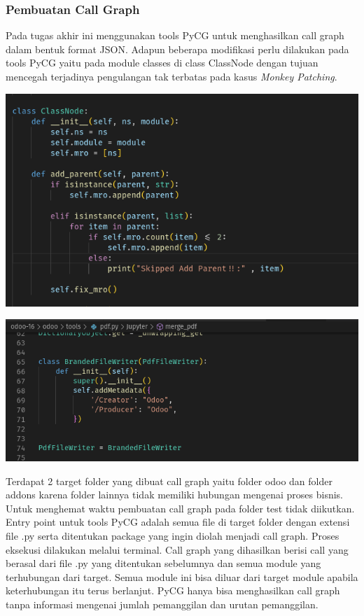 \subsubsection{Pembuatan Call Graph}
Pada tugas akhir ini menggunakan tools PyCG untuk menghasilkan call graph dalam bentuk format JSON. Adapun beberapa modifikasi perlu dilakukan pada tools PyCG yaitu pada module classes di class ClassNode dengan tujuan mencegah terjadinya pengulangan tak terbatas pada kasus \textit{Monkey Patching}.
\begin{center}
	\includegraphics[width=14cm]{img/bab_3/ModifiedPyCG.png}
	\label{fig:asd}
\end{center}
\begin{center}
	\includegraphics[width=14cm]{img/bab_3/MonkeyPatch.png}
	\label{fig:asd}
\end{center}
Terdapat 2 target folder yang dibuat call graph yaitu folder odoo dan folder addons karena folder lainnya tidak memiliki hubungan mengenai proses bisnis. Untuk menghemat waktu pembuatan call graph pada folder test tidak diikutkan.  Entry point untuk tools PyCG adalah semua file di target folder dengan extensi file .py serta ditentukan package yang ingin diolah menjadi call graph. Proses eksekusi dilakukan melalui terminal. Call graph yang dihasilkan berisi call yang berasal dari file .py yang ditentukan sebelumnya dan semua module yang terhubungan dari target. Semua module ini bisa diluar dari target module apabila keterhubungan itu terus berlanjut. PyCG hanya bisa menghasilkan call graph tanpa informasi mengenai jumlah pemanggilan dan urutan pemanggilan.
